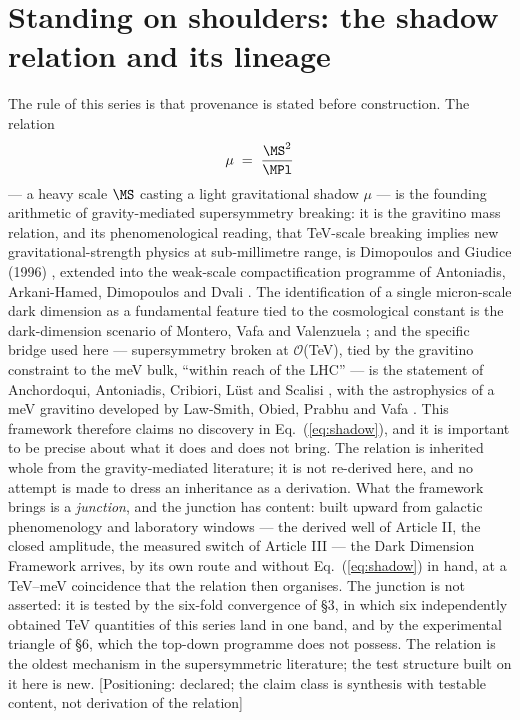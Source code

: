 \section{Standing on shoulders: the shadow relation and its lineage}
The rule of this series is that provenance is stated before construction. The relation
\begin{equation}
\mu\;=\;\frac{\MS^{2}}{\MPl}
\label{eq:shadow}
\end{equation}
--- a heavy scale $\MS$ casting a light gravitational shadow $\mu$ --- is the founding arithmetic of gravity-mediated supersymmetry breaking: it is the gravitino mass relation, and its phenomenological reading, that TeV-scale breaking implies new gravitational-strength physics at sub-millimetre range, is Dimopoulos and Giudice (1996) \cite{DG96}, extended into the weak-scale compactification programme of Antoniadis, Arkani-Hamed, Dimopoulos and Dvali \cite{ADD98}. The identification of a single micron-scale dark dimension as a fundamental feature tied to the cosmological constant is the dark-dimension scenario of Montero, Vafa and Valenzuela \cite{MVV}; and the specific bridge used here --- supersymmetry broken at $\mathcal{O}$(TeV), tied by the gravitino constraint to the meV bulk, ``within reach of the LHC'' --- is the statement of Anchordoqui, Antoniadis, Cribiori, L\"ust and Scalisi \cite{AAL}, with the astrophysics of a meV gravitino developed by Law-Smith, Obied, Prabhu and Vafa \cite{CPV}. This framework therefore claims no discovery in Eq.~(\ref{eq:shadow}), and it is important to be precise about what it does and does not bring. The relation is inherited whole from the gravity-mediated literature; it is not re-derived here, and no attempt is made to dress an inheritance as a derivation. What the framework brings is a \emph{junction}, and the junction has content: built upward from galactic phenomenology and laboratory windows --- the derived well of Article II, the closed amplitude, the measured switch of Article III --- the Dark Dimension Framework arrives, by its own route and without Eq.~(\ref{eq:shadow}) in hand, at a TeV--meV coincidence that the relation then organises. The junction is not asserted: it is tested by the six-fold convergence of \S3, in which six independently obtained TeV quantities of this series land in one band, and by the experimental triangle of \S6, which the top-down programme does not possess. The relation is the oldest mechanism in the supersymmetric literature; the test structure built on it here is new. [Positioning: declared; the claim class is synthesis with testable content, not derivation of the relation]

